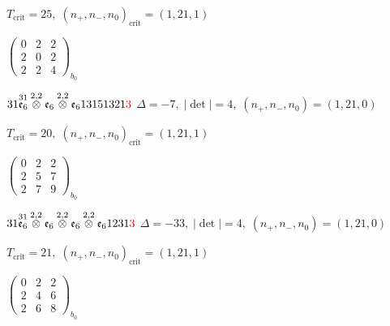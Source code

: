 \documentclass[10pt]{article}
\begin{document}
\hspace{1em}$T_{\text{crit}}=25,\; (n_+,n_-,n_0)_{\text{crit}}=(1,21,1)$

\hspace{2em}$\left(\begin{smallmatrix}0 & 2 & 2 \\ 2 & 0 & 2 \\ 2 & 2 & 4\end{smallmatrix}\right)_{\!b_0}$

\smallskip

$31\overset{31}{\mathfrak{e}_6}\overset{2,2}{\otimes}\mathfrak{e}_6\overset{2,2}{\otimes}\mathfrak{e}_613151321\textcolor{red}{3}$ \quad $\Delta=-7,\; |\det|=4,\; (n_+,n_-,n_0)=(1,21,0)$

\hspace{1em}$T_{\text{crit}}=20,\; (n_+,n_-,n_0)_{\text{crit}}=(1,21,1)$

\hspace{2em}$\left(\begin{smallmatrix}0 & 2 & 2 \\ 2 & 5 & 7 \\ 2 & 7 & 9\end{smallmatrix}\right)_{\!b_0}$

\smallskip

$31\overset{31}{\mathfrak{e}_6}\overset{2,2}{\otimes}\mathfrak{e}_6\overset{2,2}{\otimes}\mathfrak{e}_6\overset{2,2}{\otimes}\mathfrak{e}_61231\textcolor{red}{3}$ \quad $\Delta=-33,\; |\det|=4,\; (n_+,n_-,n_0)=(1,21,0)$

\hspace{1em}$T_{\text{crit}}=21,\; (n_+,n_-,n_0)_{\text{crit}}=(1,21,1)$

\hspace{2em}$\left(\begin{smallmatrix}0 & 2 & 2 \\ 2 & 4 & 6 \\ 2 & 6 & 8\end{smallmatrix}\right)_{\!b_0}$

\smallskip
\end{document}
